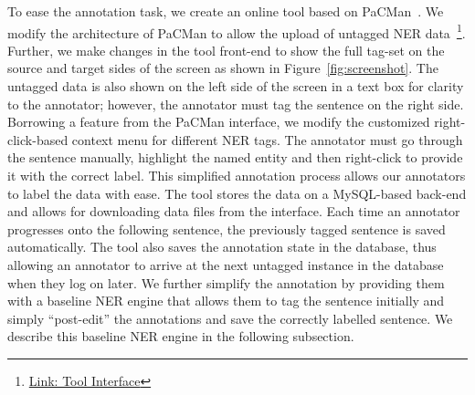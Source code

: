 \documentclass[10pt, a4paper]{article}
\begin{document}
To ease the annotation task, we create an online tool based on PaCMan~\cite{kanojia-etal-2014-pacman}. We modify the architecture of PaCMan to allow the upload of untagged NER data~\footnote{\href{http://www.cfilt.iitb.ac.in/ner/admin/login.php
}{Link: Tool Interface}}. Further, we make changes in the tool front-end to show the full tag-set on the source and target sides of the screen as shown in Figure~\ref{fig:screenshot}. The untagged data is also shown on the left side of the screen in a text box for clarity to the annotator; however, the annotator must tag the sentence on the right side. Borrowing a feature from the PaCMan interface, we modify the customized right-click-based context menu for different NER tags. The annotator must go through the sentence manually, highlight the named entity and then right-click to provide it with the correct label. This simplified annotation process allows our annotators to label the data with ease. The tool stores the data on a MySQL-based back-end and allows for downloading data files from the interface. Each time an annotator progresses onto the following sentence, the previously tagged sentence is saved automatically. The tool also saves the annotation state in the database, thus allowing an annotator to arrive at the next untagged instance in the database when they log on later. We further simplify the annotation by providing them with a baseline NER engine that allows them to tag the sentence initially and simply ``post-edit'' the annotations and save the correctly labelled sentence. We describe this baseline NER engine in the following subsection. 
\end{document}
